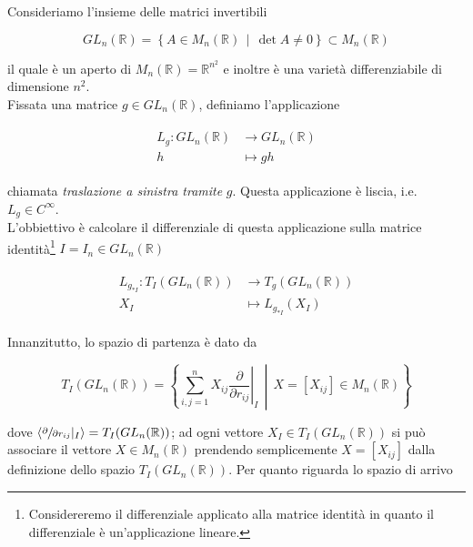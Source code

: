 Consideriamo l'insieme delle matrici invertibili

\begin{equation}
	GL_{n}(\mathbb{R}) = \left\{ A \in M_{n}(\mathbb{R}) \, \middle| \, \det A \neq 0 \right\} \subset M_{n}(\mathbb{R})
\end{equation}

il quale è un aperto di $ M_{n}(\mathbb{R}) = \mathbb{R}^{n^{2}} $ e inoltre è una varietà differenziabile di dimensione $ n^{2} $.\\
Fissata una matrice $ g \in GL_{n}(\mathbb{R}) $, definiamo l'applicazione

\begin{align}
	\begin{split}
		L_{g} : GL_{n}(\mathbb{R}) &\to GL_{n}(\mathbb{R})\\
		h &\mapsto g h
	\end{split}
\end{align}

chiamata \textit{traslazione a sinistra tramite} $ g $. Questa applicazione è liscia, i.e. $ L_{g} \in C^{\infty} $.\\
L'obbiettivo è calcolare il differenziale di questa applicazione sulla matrice identità\footnote{%
	Considereremo il differenziale applicato alla matrice identità in quanto il differenziale è un'applicazione lineare.%
} $ I = I_{n} \in GL_{n}(\mathbb{R}) $

\begin{align}
	\begin{split}
		L_{g_{*I}} : T_{I}(GL_{n}(\mathbb{R})) &\to T_{g}(GL_{n}(\mathbb{R}))\\
		X_{I} &\mapsto L_{g_{*I}}(X_{I})
	\end{split}
\end{align}

Innanzitutto, lo spazio di partenza è dato da

\begin{equation}
	T_{I}(GL_{n}(\mathbb{R})) = \left\{ \sum_{i,j=1}^{n} X_{ij} \left. \dfrac{\partial}{\partial r_{ij}} \right|_{I} \, \middle| \, X=[X_{ij}] \in M_{n}(\mathbb{R}) \right\}
\end{equation}

dove $ \langle \sfrac{\partial}{\partial r_{ij}} |_{I} \rangle = T_{I}(GL_{n}(\mathbb{R})) $; ad ogni vettore $ X_{I} \in T_{I}(GL_{n}(\mathbb{R})) $ si può associare il vettore $ X \in M_{n}(\mathbb{R}) $ prendendo semplicemente $ X=[X_{ij}] $ dalla definizione dello spazio $ T_{I}(GL_{n}(\mathbb{R})) $. Per quanto riguarda lo spazio di arrivo

